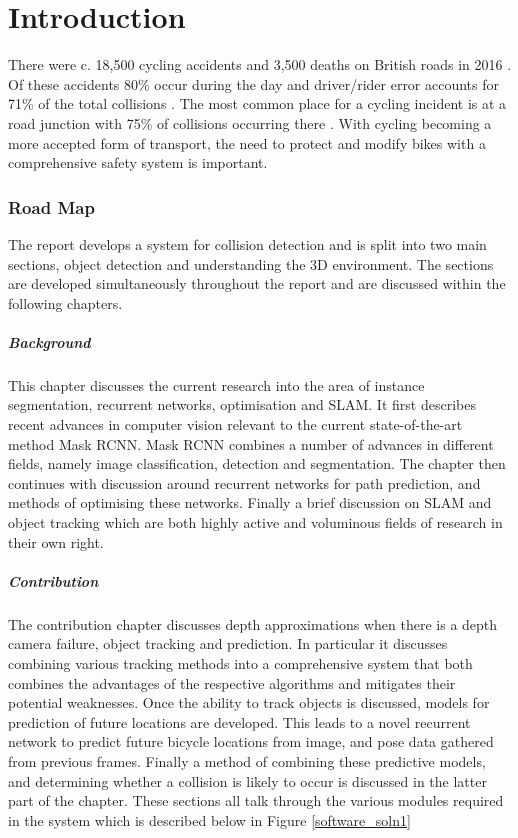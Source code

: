 \documentclass[11pt,twoside]{report}
\begin{document}
\chapter{Introduction}

There were c. 18,500 cycling accidents and 3,500 deaths on British roads in 2016 \cite{DFT_fig}. Of these accidents 80\% occur during the day and driver/rider error accounts for 71\% of the total collisions \cite{DFT_fig2}. The most common place for a cycling incident is at a road junction with 75\% of collisions occurring there \cite{DFT_fig3}. With cycling becoming a more accepted form of transport, the need to protect and modify bikes with a comprehensive safety system is important.

\subsection{Road Map} The report develops a system for collision detection and is split into two main sections, object detection and understanding the 3D environment. The sections are developed simultaneously throughout the report and are discussed within the following chapters.

\paragraph{Background} This chapter discusses the current research into the area of instance segmentation, recurrent networks, optimisation and SLAM. It first describes recent advances in computer vision relevant to the current state-of-the-art method Mask RCNN. Mask RCNN combines a number of advances in different fields, namely image classification, detection and segmentation. The chapter then continues with discussion around recurrent networks for path prediction, and methods of optimising these networks. Finally a brief discussion on SLAM and object tracking which are both highly active and voluminous fields of research in their own right.

\paragraph{Contribution}
The contribution chapter discusses depth approximations when there is a depth camera failure, object tracking and prediction. In particular it discusses combining various tracking methods into a comprehensive system that both combines the advantages of the respective algorithms and mitigates their potential weaknesses. Once the ability to track objects is discussed, models for prediction of future locations are developed. This leads to a novel recurrent network to predict future bicycle locations from image, and pose data gathered from previous frames. Finally a method of combining these predictive models, and determining whether a collision is likely to occur is discussed in the latter part of the chapter. These sections all talk through the various modules required in the system which is described below in Figure \ref{software_soln1}
\end{document}
